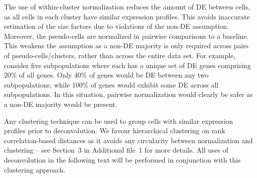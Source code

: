 \documentclass{bmcart}
\newcommand{\suppclustering}{3}
\begin{document}

The use of within-cluster normalization reduces the amount of DE between cells, as all cells in each cluster have similar expression profiles.
This avoids inaccurate estimation of the size factors due to violations of the non-DE assumption.
Moreover, the pseudo-cells are normalized in pairwise comparisons to a baseline.
This weakens the assumption as a non-DE majority is only required across pairs of pseudo-cells/clusters, rather than across the entire data set.
For example, consider five subpopulations where each has a unique set of DE genes comprising 20\% of all genes.
Only 40\% of genes would be DE between any two subpopulations, while 100\% of genes would exhibit some DE across all subpopulations.
In this situation, pairwise normalization would clearly be safer as a non-DE majority would be present.

Any clustering technique can be used to group cells with similar expression profiles prior to deconvolution.
We favour hierarchical clustering on rank correlation-based distances as it avoids any circularity between normalization and clustering
    -- see Section~\suppclustering{} in Additional file~1 for more details.
All uses of deconvolution in the following text will be performed in conjunction with this clustering approach.
\end{document}
